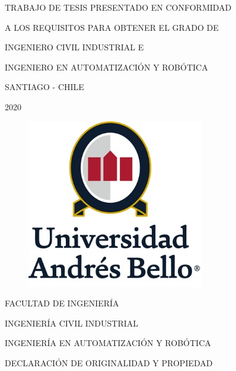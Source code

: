 \documentclass[12pt,a4paper]{article}
\begin{document}
\begin{titlepage}
\begin{center}
\begin{flushright}
TRABAJO DE TESIS PRESENTADO EN CONFORMIDAD 

A LOS REQUISITOS PARA OBTENER EL GRADO DE 

INGENIERO CIVIL INDUSTRIAL E

INGENIERO EN AUTOMATIZACIÓN Y ROBÓTICA

\end{flushright}

\vspace{2cm}

SANTIAGO - CHILE

2020

\end{center}

\end{titlepage} %


\pagebreak

\begin{center}
\begin{figure}[htb]
\begin{center}
\includegraphics[scale=0.7]{imagenes/logo_u.png}
\end{center}
\end{figure}

\vspace*{2cm}

FACULTAD DE INGENIERÍA \vspace*{0.5cm}

INGENIERÍA CIVIL INDUSTRIAL \vspace*{0.5cm}

INGENIERÍA EN AUTOMATIZACIÓN Y ROBÓTICA \vspace*{0.5cm}

DECLARACIÓN DE ORIGINALIDAD Y PROPIEDAD

\end{center}
\end{document}
